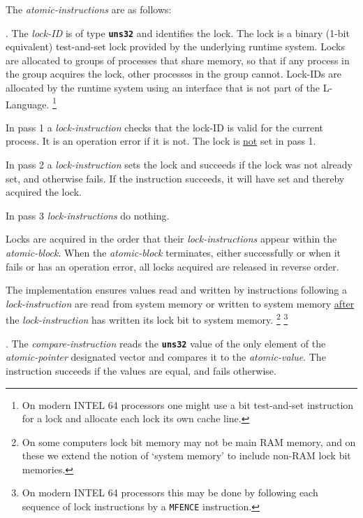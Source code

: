 \documentclass[12pt]{article}
\newcommand{\TT}[1]{{\tt \bfseries #1}}
\newenvironment{indpar}[1][0.3in]%
	{\begin{list}{}%
		     {\setlength{\itemsep}{0in}%
		      \setlength{\topsep}{0in}%
		      \setlength{\parsep}{1ex}%
		      \setlength{\labelwidth}{#1}%
		      \setlength{\leftmargin}{#1}%
		      \addtolength{\leftmargin}{\labelsep}}%
	 \item}%
	{\end{list}}
\begin{document}
The {\em atomic-instructions} are as follows:
\begin{indpar}[0.4in]
\hspace*{-0.2in}{\em \bf Lock-Instruction}.
The {\em lock-ID} is of type \TT{uns32}
and identifies the lock.
The lock is a binary (1-bit equivalent) test-and-set lock provided by the
underlying runtime system.  Locks are allocated to groups of processes
that share memory, so that if any process in the group acquires
the lock, other processes in the group cannot.  Lock-IDs are allocated
by the runtime system using an interface that is not part of the L-Language.%
\footnote{On modern INTEL 64 processors one might use a bit test-and-set
instruction for a lock and allocate each lock its own cache line.}

In pass 1 a {\em lock-instruction} checks that the lock-ID is valid
for the current process.  It is an operation error if it is not.
The lock is \underline{not} set in pass 1.

In pass 2 a {\em lock-instruction} sets the lock and succeeds if the lock
was not already set, and otherwise fails.  If the instruction succeeds,
it will have set and thereby acquired the lock.

In pass 3 {\em lock-instructions} do nothing.

Locks are acquired in the order that their {\em lock-instructions} appear
within the {\em atomic-block}.
When the {\em atomic-block} terminates, either
successfully or when it fails or has an operation error,
all locks acquired are released in reverse order.

The implementation ensures values read and written by instructions
following a {\em lock-in\-struc\-tion} are read from system memory or
written to system memory \underline{after} the {\em lock-in\-struc\-tion}
has written its lock bit to system memory.%
\footnote{On some computers lock bit memory may not be main RAM memory,
and on these we extend the notion of `system memory' to include
non-RAM lock bit memories.}%
\footnote{On modern INTEL 64 processors this may be done by following
each sequence of lock instructions by a {\tt MFENCE} instruction.}

\hspace*{-0.2in}{\em \bf Compare-Instruction}.
The {\em compare-instruction} reads the \TT{uns32}
value of the only element of the {\em atomic-pointer} designated
vector and compares it to the {\em atomic-value}.  The instruction
succeeds if the values are equal, and fails otherwise.


\end{indpar}
\end{document}
